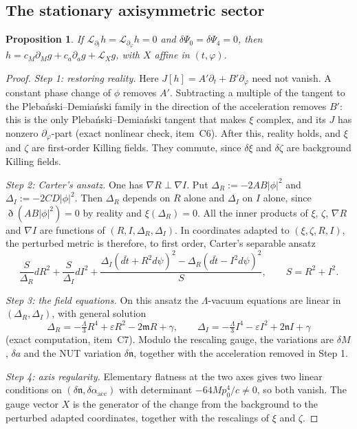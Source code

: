 \documentclass[11pt]{amsart}
\newtheorem{proposition}[theorem]{Proposition}
\theoremstyle{definition}
\theoremstyle{remark}
\numberwithin{equation}{section}
\newcommand{\cL}{\mathcal{L}}
\begin{document}
\subsection{The stationary axisymmetric sector}
\begin{proposition}\label{prop:stationary}
If $\cL_{\partial_t}h=\cL_{\partial_\varphi}h=0$ and $\delta\Psi_0=\delta\Psi_4=0$, then
$h=c_M\partial_Mg+c_a\partial_ag+\cL_Xg$, with $X$ affine in $(t,\varphi)$.
\end{proposition}

\begin{proof}
\emph{Step 1: restoring reality.} Here $J[h]=A'\partial_t+B'\partial_\varphi$ need not vanish. A constant phase change of
$\phi$ removes $A'$. Subtracting a multiple of the tangent to the Pleba\'nski--Demia\'nski family in the direction of
the acceleration removes $B'$: this is the only Pleba\'nski--Demia\'nski tangent that makes $\xi$ complex, and its
$J$ has nonzero $\partial_\varphi$-part (exact nonlinear check, item~C6). After this, reality holds, and $\xi$ and
$\zeta$ are first-order Killing fields. They commute, since $\delta\xi$ and $\delta\zeta$ are background Killing
fields.

\emph{Step 2: Carter's ansatz.} One has $\nabla R\perp\nabla I$. Put $\Delta_R:=-2AB|\phi|^2$ and
$\Delta_I:=-2CD|\phi|^2$. Then $\Delta_R$ depends on $R$ alone and $\Delta_I$ on $I$ alone, since
$\eth(AB|\phi|^2)=0$ by reality and $\xi(\Delta_R)=0$. All the inner products of $\xi$, $\zeta$, $\nabla R$ and $\nabla I$ are
functions of $(R,I,\Delta_R,\Delta_I)$. In coordinates adapted to $(\xi,\zeta,R,I)$, the perturbed metric is therefore,
to first order, Carter's separable ansatz
\[
\frac{S}{\Delta_R}dR^2+\frac{S}{\Delta_I}dI^2+\frac{\Delta_I(d\tilde t+R^2d\psi)^2-\Delta_R(d\tilde t-I^2d\psi)^2}{S},\qquad S=R^2+I^2.
\]

\emph{Step 3: the field equations.} On this ansatz the $\Lambda$-vacuum equations are linear in $(\Delta_R,\Delta_I)$,
with general solution
\[
\Delta_R=-\tfrac\Lambda3R^4+\varepsilon R^2-2\mathfrak mR+\gamma,\qquad \Delta_I=-\tfrac\Lambda3I^4-\varepsilon I^2+2\mathfrak nI+\gamma
\]
(exact computation, item~C7). Modulo the rescaling gauge, the variations are $\delta M$, $\delta a$ and the NUT
variation $\delta\mathfrak n$, together with the acceleration removed in Step 1.

\emph{Step 4: axis regularity.} Elementary flatness at the two axes gives two linear conditions on
$(\delta\mathfrak n,\delta\alpha_{\mathrm{acc}})$ with determinant $-64Mp_0^4/c\ne0$, so both vanish. The gauge
vector $X$ is the generator of the change from the background to the perturbed adapted coordinates, together with
the rescalings of $\xi$ and $\zeta$.


\end{proof}
\end{document}
